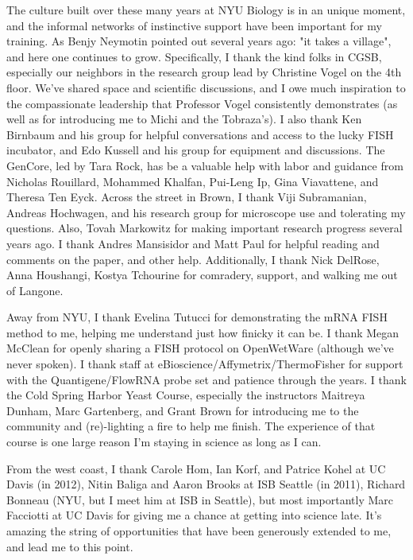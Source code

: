 \documentclass[12pt,letterpaper]{memoir}
\begin{document}
The culture built over these many years at NYU Biology is in an unique 
moment, and the informal networks of instinctive support
have been important for my training.
As Benjy Neymotin pointed out several years ago: "it takes a village",
and here one continues to grow.
Specifically,
I thank the kind folks in CGSB, especially our neighbors in
the research group lead by Christine Vogel on the 4th floor.
We've shared
space and scientific discussions, and I owe much inspiration to the 
compassionate leadership that Professor Vogel consistently 
demonstrates (as well as for introducing me to Michi and the
Tobraza's).
I also thank Ken Birnbaum and his group for helpful conversations and
access to the lucky FISH incubator, and Edo Kussell and his group
for equipment and discussions.
The GenCore, led by Tara Rock, has be a valuable help with labor
and guidance from Nicholas Rouillard, Mohammed Khalfan, Pui-Leng Ip,
Gina Viavattene, and Theresa Ten Eyck.
Across the street in Brown, I thank Viji Subramanian, 
Andreas Hochwagen, and his research group for microscope use 
and tolerating my questions.
Also, Tovah Markowitz for making important research progress
several years ago.
I thank Andres Mansisidor and Matt Paul for helpful reading and 
comments on the paper, and other help.
Additionally, I thank Nick DelRose, Anna Houshangi, Kostya Tchourine
for comradery, support, and walking me out of Langone.

Away from NYU, I thank
Evelina Tutucci for demonstrating the mRNA FISH method to me,
helping me understand just how finicky it can be.
I thank Megan McClean for openly sharing a FISH protocol on
OpenWetWare (although we've never spoken).
I thank staff at eBioscience/Affymetrix/ThermoFisher for support with
the Quantigene/FlowRNA probe set and patience through the years.
I thank the Cold Spring Harbor Yeast Course, especially the instructors
Maitreya Dunham, Marc Gartenberg, and Grant Brown for introducing
me to the community and (re)-lighting a fire to help me finish.
The experience of that course is one large reason I'm staying in 
science as long as I can.

From the west coast, I thank Carole Hom, Ian Korf, 
and Patrice Kohel at UC Davis (in 2012), 
Nitin Baliga and Aaron Brooks at ISB Seattle (in 2011), 
Richard Bonneau (NYU, but I meet him at ISB in Seattle),
but most importantly Marc Facciotti at UC Davis for 
giving me a chance at getting into science late.
It's amazing the string of opportunities that have been generously
extended to me, and lead me to this point.
\end{document}
